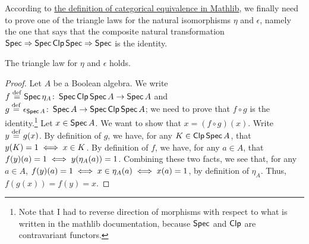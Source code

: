\documentclass[a4paper,10pt]{article}
\numberwithin{theorem}{section}
\begin{document}
According to
\href{https://leanprover-community.github.io/mathlib4_docs/Mathlib/CategoryTheory/Equivalence.html#CategoryTheory.Equivalence}{the
definition of categorical equivalence in Mathlib}, we finally need to prove one
of the triangle laws for the natural isomorphisms $\eta$ and $\epsilon$, namely
    the one that says that the composite natural transformation $\operatorname*{\mathsf{Spec}} \Rightarrow
    \operatorname*{\mathsf{Spec}} \operatorname*{\mathsf{Clp}} \operatorname*{\mathsf{Spec}} \Rightarrow \operatorname*{\mathsf{Spec}}$ is the identity.
    \begin{proposition}\label{triangle}
    The triangle law for $\eta$ and $\epsilon$ holds. 
\end{proposition}
\begin{proof}
    Let $A$ be a Boolean algebra. We write $f \stackrel{\mathrm{def}}{=} \operatorname*{\mathsf{Spec}} \eta_A
    \colon \operatorname*{\mathsf{Spec}} \operatorname*{\mathsf{Clp}} \operatorname*{\mathsf{Spec}} A \to \operatorname*{\mathsf{Spec}} A$ and $g \stackrel{\mathrm{def}}{=} \epsilon_{\operatorname*{\mathsf{Spec}} A} \colon \operatorname*{\mathsf{Spec}} A
    \to \operatorname*{\mathsf{Spec}} \operatorname*{\mathsf{Clp}} \operatorname*{\mathsf{Spec}} A$; we need to prove that $f \circ g$ is the
    identity.\footnote{Note that I had to reverse direction of 
    morphisms with respect to what is written in the mathlib documentation, because $\operatorname*{\mathsf{Spec}}$ and $\operatorname*{\mathsf{Clp}}$ are contravariant functors.} 
    Let $x \in \operatorname*{\mathsf{Spec}} A$. We want to show that $x
    = (f \circ g)(x)$.  Write $y \stackrel{\mathrm{def}}{=} g(x)$. By definition of $g$, we have, for any $K \in \operatorname*{\mathsf{Clp}}
    \operatorname*{\mathsf{Spec}} A$, that $y(K) = 1 \iff x \in K$. By definition of $f$, we have,
    for any $a \in A$, that $f(y)(a) = 1 \iff y(\eta_A(a)) = 1$.
    Combining these two facts, we see that, for any $a \in A$, $f(y)(a) = 1 \iff x \in \eta_A(a)
    \iff x(a) = 1$, by definition of $\eta_A$. Thus, $f(g(x)) = f(y) = x$.
\end{proof}


\end{document}
